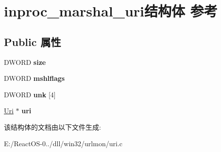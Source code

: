 \hypertarget{structinproc__marshal__uri}{}\section{inproc\+\_\+marshal\+\_\+uri结构体 参考}
\label{structinproc__marshal__uri}
\subsection*{Public 属性}
\begin{DoxyCompactItemize}
\item 
\mbox{\label{structinproc__marshal__uri_a9fd48ecd9daafd7ee2a3bf3a1736dbf0}} 
D\+W\+O\+RD {\bfseries size}
\item 
\mbox{\label{structinproc__marshal__uri_accc98899a5ae1d3d4993ae974571c862}} 
D\+W\+O\+RD {\bfseries mshlflags}
\item 
\mbox{\label{structinproc__marshal__uri_a0d679cd08cac9eec263fefb35f8166bf}} 
D\+W\+O\+RD {\bfseries unk} \mbox{[}4\mbox{]}
\item 
\mbox{\label{structinproc__marshal__uri_a4988f4159bae5aee6d7229d1d3a956ff}} 
\hyperlink{struct_uri}{Uri} $\ast$ {\bfseries uri}
\end{DoxyCompactItemize}


该结构体的文档由以下文件生成\+:\begin{DoxyCompactItemize}
\item 
E\+:/\+React\+O\+S-\/0../dll/win32/urlmon/uri.\+c\end{DoxyCompactItemize}
